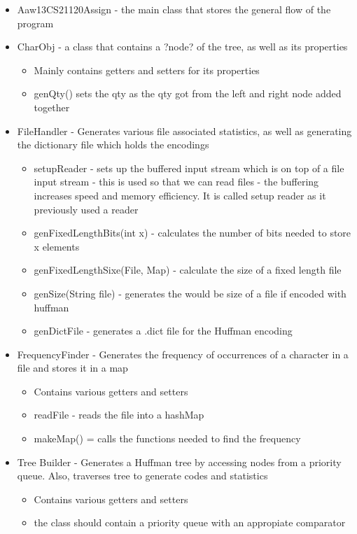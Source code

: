 \documentclass[11pt, oneside]{amsart}
\begin{document}
\begin{itemize}
	\item Aaw13CS21120Assign - the main class that stores the general flow of the program
	\item CharObj - a class that contains a ?node? of the tree, as well as its properties
	\begin{itemize}
		\item Mainly contains getters and setters for its properties
		\item genQty() sets the qty as the qty got from the left and right node added together
	\end{itemize}
	\item FileHandler - Generates various file associated statistics, as well as generating the dictionary file which holds the encodings
	\begin{itemize}
		\item setupReader - sets up the buffered input stream which is on top of a file input stream - this is used so that we can read files - the buffering increases speed and memory efficiency. It is called setup reader as it previously used a reader
		\item genFixedLengthBits(int x) - calculates the number of bits needed to store x elements
		\item genFixedLengthSixe(File, Map) - calculate the size of a fixed length file
		\item genSize(String file) - generates the would be size of a file if encoded with huffman
		\item genDictFile - generates a .dict file for the Huffman encoding
	\end{itemize}
	\item FrequencyFinder - Generates the frequency of occurrences of a character in a file and stores it in a map
	\begin{itemize}
		\item Contains various getters and setters
		\item readFile - reads the file into a hashMap
		\item makeMap() = calls the functions needed to find the frequency
	\end{itemize}
	\item Tree Builder - Generates a Huffman tree by accessing nodes from a priority queue. Also, traverses tree to generate codes and statistics
	\begin{itemize}
		\item Contains various getters and setters
		\item the class should contain a priority queue with an appropiate comparator

\end{itemize}
\end{itemize}
\end{document}
